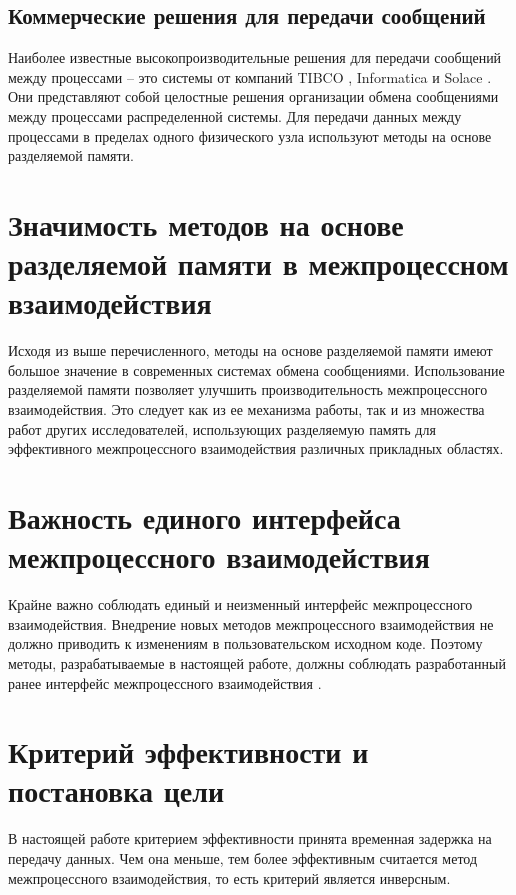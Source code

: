 \subsection{Коммерческие решения для передачи сообщений}

Наиболее известные высокопроизводительные решения для передачи сообщений между процессами -- это системы от компаний TIBCO \cite{TIBCO}, Informatica \cite{Informatica} и Solace \cite{Solace}. Они представляют собой целостные решения организации обмена сообщениями между процессами распределенной системы. Для передачи данных между процессами в пределах одного физического узла используют методы на основе разделяемой памяти.

\section{Значимость методов на основе разделяемой памяти в межпроцессном взаимодействия}

Исходя из выше перечисленного, методы на основе разделяемой памяти имеют большое значение в современных системах обмена сообщениями. Использование разделяемой памяти позволяет улучшить производительность межпроцессного взаимодействия. Это следует как из ее механизма работы, так и из множества работ других исследователей, использующих разделяемую память для эффективного межпроцессного взаимодействия различных прикладных областях.

\section{Важность единого интерфейса межпроцессного взаимодействия}

Крайне важно соблюдать единый и неизменный интерфейс межпроцессного взаимодействия. Внедрение новых методов межпроцессного взаимодействия не должно приводить к изменениям в пользовательском исходном коде. Поэтому методы, разрабатываемые в настоящей работе, должны соблюдать разработанный ранее интерфейс межпроцессного взаимодействия \cite{GubarevKMU18}.

\finishrelatedwork

\section{Критерий эффективности и постановка цели}

В настоящей работе критерием эффективности принята временная задержка на передачу данных. Чем она меньше, тем более эффективным считается метод межпроцессного взаимодействия, то есть критерий является инверсным.

